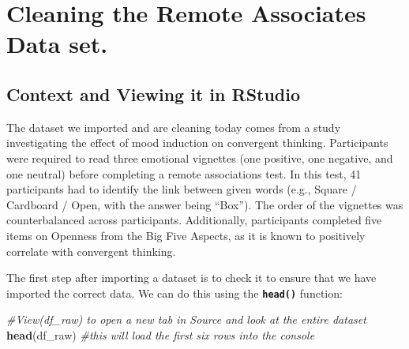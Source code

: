 \documentclass[
]{book}
\newenvironment{Shaded}{\begin{snugshade}}{\end{snugshade}}
\newcommand{\CommentTok}[1]{\textcolor[rgb]{0.56,0.35,0.01}{\textit{#1}}}
\newcommand{\FunctionTok}[1]{\textcolor[rgb]{0.13,0.29,0.53}{\textbf{#1}}}
\newcommand{\NormalTok}[1]{#1}
\begin{document}
\section{Cleaning the Remote Associates Data set.}\label{cleaning-the-remote-associates-data-set.}

\subsection{Context and Viewing it in RStudio}\label{context-and-viewing-it-in-rstudio}

The dataset we imported and are cleaning today comes from a study investigating the effect of mood induction on convergent thinking. Participants were required to read three emotional vignettes (one positive, one negative, and one neutral) before completing a remote associations test. In this test, 41 participants had to identify the link between given words (e.g., Square / Cardboard / Open, with the answer being ``Box''). The order of the vignettes was counterbalanced across participants. Additionally, participants completed five items on Openness from the Big Five Aspects, as it is known to positively correlate with convergent thinking.

The first step after importing a dataset is to check it to ensure that we have imported the correct data. We can do this using the \textbf{\texttt{head()}} function:

\begin{Shaded}
\begin{Highlighting}[]
\CommentTok{\#View(df\_raw) to open a new tab in Source and look at the entire dataset}
\FunctionTok{head}\NormalTok{(df\_raw) }\CommentTok{\#this will load the first six rows into the console}
\end{Highlighting}
\end{Shaded}
\end{document}
